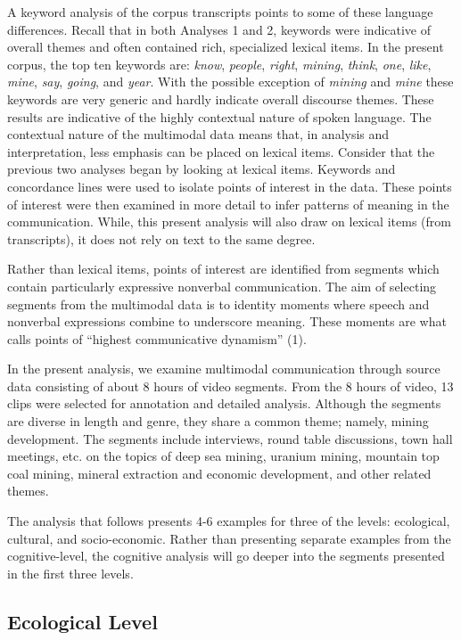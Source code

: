 A keyword analysis of the corpus transcripts points to some of these language differences. Recall that in both Analyses 1 and 2, keywords were indicative of overall themes and often contained rich, specialized lexical items. In the present corpus, the top ten keywords are: \textit{know}, \textit{people}, \textit{right}, \textit{mining}, \textit{think}, \textit{one}, \textit{like}, \textit{mine}, \textit{say}, \textit{going}, and \textit{year}. With the possible exception of \textit{mining} and \textit{mine} these keywords are very generic and hardly indicate overall discourse themes. These results are indicative of the highly contextual nature of spoken language. The contextual nature of the multimodal data means that, in analysis and interpretation, less emphasis can be placed on lexical items. Consider that the previous two analyses began by looking at lexical items. Keywords and concordance lines were used to isolate points of interest in the data. These points of interest were then examined in more detail to infer patterns of meaning in the communication. While, this present analysis will also draw on lexical items (from transcripts), it does not rely on text to the same degree. 

Rather than lexical items, points of interest are identified from segments which contain particularly expressive nonverbal communication. The aim of selecting segments from the multimodal data is to identity moments where speech and nonverbal expressions combine to underscore meaning. These moments are what \cite*{McNeill2005b} calls points of ``highest communicative dynamism'' (1). 

In the present analysis, we examine multimodal communication through source data consisting of about 8 hours of video segments. From the 8 hours of video, 13 clips were selected for annotation and detailed analysis. Although the segments are diverse in length and genre, they share a common theme; namely, mining development. The segments include interviews, round table discussions, town hall meetings, etc. on the topics of deep sea mining, uranium mining, mountain top coal mining, mineral extraction and economic development, and other related themes. 

The analysis that follows presents 4-6 examples for three of the levels: ecological, cultural, and socio-economic. Rather than presenting separate examples from the cognitive-level, the cognitive analysis will go deeper into the segments presented in the first three levels.

\subsection{Ecological Level}

